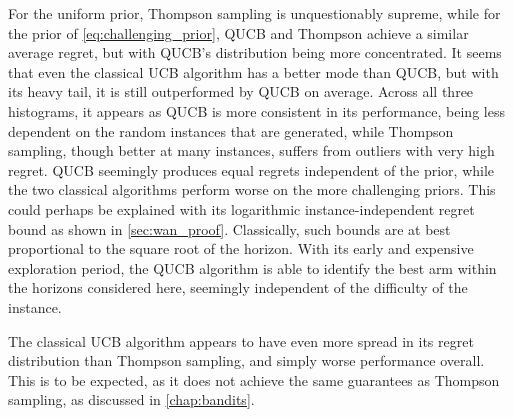For the uniform prior, Thompson sampling is unquestionably supreme, while for the prior of \cref{eq:challenging_prior}, QUCB and Thompson achieve a similar average regret, but with QUCB's distribution being more concentrated.
It seems that even the classical UCB algorithm has a better mode than QUCB, but with its heavy tail, it is still outperformed by QUCB on average.
Across all three histograms, it appears as QUCB is more consistent in its performance, being less dependent on the random instances that are generated, while Thompson sampling, though better at many instances, suffers from outliers with very high regret.
QUCB seemingly produces equal regrets independent of the prior, while the two classical algorithms perform worse on the more challenging priors.
This could perhaps be explained with its logarithmic instance-independent regret bound as shown in \cref{sec:wan_proof}.
Classically, such bounds are at best proportional to the square root of the horizon.
With its early and expensive exploration period, the QUCB algorithm is able to identify the best arm within the horizons considered here, seemingly independent of the difficulty of the instance.

The classical UCB algorithm appears to have even more spread in its regret distribution than Thompson sampling, and simply worse performance overall.
This is to be expected, as it does not achieve the same guarantees as Thompson sampling, as discussed in \cref{chap:bandits}.

\vfill\pagebreak


